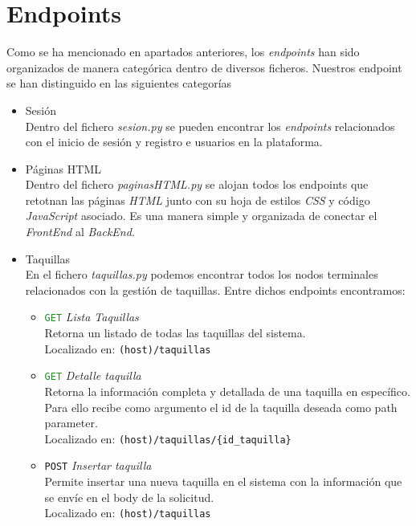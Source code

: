 \documentclass[12pt]{report}
\begin{document}
\section{Endpoints}
Como se ha mencionado en apartados anteriores, los \textit{endpoints} han sido organizados de manera categórica dentro de diversos ficheros. Nuestros endpoint se han distinguido en las siguientes categorías
\begin{itemize}
    \item Sesión\\
    Dentro del fichero \textit{sesion.py} se pueden encontrar los \textit{endpoints} relacionados con el inicio de sesión y registro e usuarios en la plataforma. 
    \item Páginas HTML\\
    Dentro del fichero \textit{paginasHTML.py} se alojan todos los endpoints que retotnan las páginas \textit{HTML} junto con su hoja de estilos \textit{CSS} y código \textit{JavaScript} asociado. Es una manera simple y organizada de conectar el \textit{FrontEnd} al \textit{BackEnd}.
    \item Taquillas\\
    En el fichero \textit{taquillas.py} podemos encontrar todos los nodos terminales relacionados con la gestión de taquillas.
    Entre dichos endpoints encontramos:
    \begin{itemize}
        \item \textcolor{ForestGreen}{\texttt{GET}} \textit{Lista Taquillas}\\
        Retorna un listado de todas las taquillas del sistema.\\
        Localizado en: \texttt{(host)/taquillas}
        \item \textcolor{ForestGreen}{\texttt{GET}} \textit{Detalle taquilla}\\
        Retorna la información completa y detallada de una taquilla en específico.\\
        Para ello recibe como argumento el id de la taquilla deseada como path parameter.\\
        Localizado en: \texttt{(host)/taquillas/\{id\_taquilla\}}
        \item \textcolor{YellowOrange}{\texttt{POST}} \textit{Insertar taquilla}\\
        Permite insertar una nueva taquilla en el sistema con la información que se envíe en el body de la solicitud.
        \\Localizado en: \texttt{(host)/taquillas}
    \end{itemize}

\end{itemize}
\end{document}
